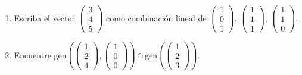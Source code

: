 \documentclass[11pt]{article}
\begin{document}
\begin{tcolorbox}[colback=blue1!10, colframe=blue1, title=Enunciado]
\begin{enumerate}[label=\alph*)]
    \item Escriba el vector $\begin{pmatrix} 3 \\ 4 \\ 5 \end{pmatrix}$ como combinación lineal de 
    $\begin{pmatrix} 1 \\ 0 \\ 1 \end{pmatrix}$, $\begin{pmatrix} 1 \\ 1 \\ 1 \end{pmatrix}$, 
    $\begin{pmatrix} 1 \\ 1 \\ 0 \end{pmatrix}$.
    
    \item Encuentre $\text{gen}\left(\begin{pmatrix} 1 \\ 2 \\ 4 \end{pmatrix},\begin{pmatrix} 1 \\ 0 \\ 0 \end{pmatrix}\right)\cap 
    \text{gen}\left(\begin{pmatrix} 1 \\ 2 \\ 3 \end{pmatrix}\right)$.
\end{enumerate}
\end{tcolorbox}
\end{document}
